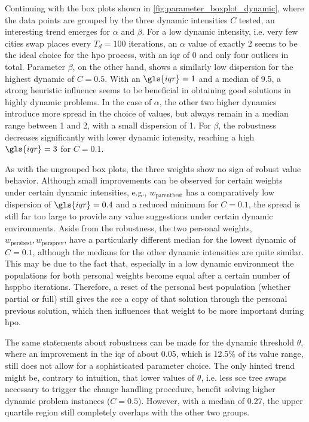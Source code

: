 Continuing with the box plots shown in \cref{fig:parameter_boxplot_dynamic}, where the data points are grouped by the three dynamic intensities $C$ tested, an interesting trend emerges for $\alpha$ and $\beta$. For a low dynamic intensity, i.e. very few cities swap places every $T_d = 100$ iterations, an $\alpha$ value of exactly 2 seems to be the ideal choice for the \gls{hpo} process, with an \gls{iqr} of 0 and only four outliers in total. Parameter $\beta$, on the other hand, shows a similarly low dispersion for the highest dynamic of $C = 0.5$. With an $\gls{iqr} = 1$ and a median of 9.5, a strong heuristic influence seems to be beneficial in obtaining good solutions in highly dynamic problems. In the case of $\alpha$, the other two higher dynamics introduce more spread in the choice of values, but always remain in a median range between 1 and 2, with a small dispersion of 1. For $\beta$, the robustness decreases significantly with lower dynamic intensity, reaching a high $\gls{iqr} = 3$ for $C = 0.1$.

As with the ungrouped box plots, the three weights show no sign of robust value behavior. Although small improvements can be observed for certain weights under certain dynamic intensities, e.g., $w_{\text{parentbest}}$ has a comparatively low dispersion of $\gls{iqr} = 0.4$ and a reduced minimum for $C=0.1$, the spread is still far too large to provide any value suggestions under certain dynamic environments. 
Aside from the robustness, the two personal weights, $w_{\text{persbest}}, w_{\text{persprev}}$, have a particularly different median for the lowest dynamic of $C=0.1$, although the medians for the other dynamic intensities are quite similar. This may be due to the fact that, especially in a low dynamic environment the populations for both personal weights become equal after a certain number of \gls{hsppbo} iterations. Therefore, a reset of the personal best population (whether partial or full) still gives the \gls{sce} a copy of that solution through the personal previous solution, which then influences that weight to be more important during \gls{hpo}.

The same statements about robustness can be made for the dynamic threshold $\theta$, where an improvement in the \gls{iqr} of about 0.05, which is 12.5\% of its value range, still does not allow for a sophisticated parameter choice. The only hinted trend might be, contrary to intuition, that lower values of $\theta$, i.e. less \gls{sce} tree swaps necessary to trigger the change handling procedure, benefit solving higher dynamic problem instances ($C=0.5$). However, with a median of 0.27, the upper quartile region still completely overlaps with the other two groups.

